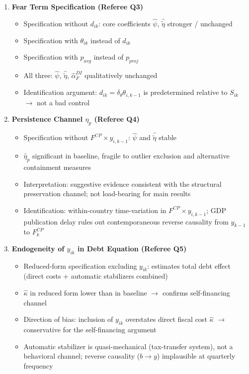 \documentclass[12pt, a4paper]{article}
\begin{document}
\begin{enumerate}
\item \textbf{Fear Term Specification (Referee Q3)}
\begin{itemize}
    \item Specification without $d_{ik}$: core coefficients
        $\hat{\psi}$, $\hat{\tilde{\eta}}$ stronger / unchanged
    \item Specification with $\theta_{ik}$ instead of $d_{ik}$
    \item Specification with $p_{avg}$ instead of $p_{proj}$
    \item All three: $\hat{\psi}$, $\hat{\tilde{\eta}}$, $\hat{\alpha}_F^{DI}$
        qualitatively unchanged
    \item Identification argument: $d_{ik} = \delta_\theta \theta_{i,k-1}$
        is predetermined relative to $S_{ik}$ $\to$ not a bad control
\end{itemize}

\item \textbf{Persistence Channel $\eta_p$ (Referee Q4)}
\begin{itemize}
    \item Specification without $F^{CP} \times y_{i,k-1}$:
        $\hat{\psi}$ and $\hat{\tilde{\eta}}$ stable
    \item $\hat{\eta}_p$ significant in baseline, fragile to outlier
        exclusion and alternative containment measures
    \item Interpretation: suggestive evidence consistent with the
        structural preservation channel; not load-bearing for main results
    \item Identification: within-country time-variation in
        $F^{CP} \times y_{i,k-1}$; GDP publication delay rules out
        contemporaneous reverse causality from $y_{k-1}$ to $F^{CP}_k$
\end{itemize}

\item \textbf{Endogeneity of $y_{ik}$ in Debt Equation (Referee Q5)}
\begin{itemize}
    \item Reduced-form specification excluding $y_{ik}$: estimates total
        debt effect (direct costs $+$ automatic stabilizers combined)
    \item $\hat{\kappa}$ in reduced form lower than in baseline $\to$
        confirms self-financing channel
    \item Direction of bias: inclusion of $y_{ik}$ overstates direct
        fiscal cost $\hat{\kappa}$ $\to$ conservative for the
        self-financing argument
    \item Automatic stabilizer is quasi-mechanical (tax-transfer system),
        not a behavioral channel; reverse causality ($b \to y$) implausible
        at quarterly frequency
\end{itemize}


\end{enumerate}
\end{document}

